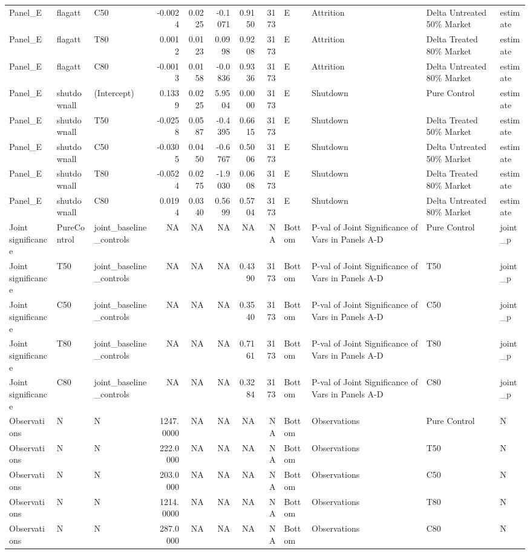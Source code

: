 \begin{table}
\begin{tabular}[t]{lllrrrrrllll}
Panel\_E & flagatt & C50 & -0.0024 & 0.0225 & -0.1071 & 0.9150 & 3173 & E & Attrition & Delta Untreated 50\% Market & estimate\\
Panel\_E & flagatt & T80 & 0.0012 & 0.0123 & 0.0998 & 0.9208 & 3173 & E & Attrition & Delta Treated 80\% Market & estimate\\
Panel\_E & flagatt & C80 & -0.0013 & 0.0158 & -0.0836 & 0.9336 & 3173 & E & Attrition & Delta Untreated 80\% Market & estimate\\
\addlinespace
Panel\_E & shutdownall & (Intercept) & 0.1339 & 0.0225 & 5.9504 & 0.0000 & 3173 & E & Shutdown & Pure Control & estimate\\
Panel\_E & shutdownall & T50 & -0.0258 & 0.0587 & -0.4395 & 0.6615 & 3173 & E & Shutdown & Delta Treated 50\% Market & estimate\\
Panel\_E & shutdownall & C50 & -0.0305 & 0.0450 & -0.6767 & 0.5006 & 3173 & E & Shutdown & Delta Untreated 50\% Market & estimate\\
Panel\_E & shutdownall & T80 & -0.0524 & 0.0275 & -1.9030 & 0.0608 & 3173 & E & Shutdown & Delta Treated 80\% Market & estimate\\
Panel\_E & shutdownall & C80 & 0.0194 & 0.0340 & 0.5699 & 0.5704 & 3173 & E & Shutdown & Delta Untreated 80\% Market & estimate\\
\addlinespace
Joint significance & PureControl & joint\_baseline\_controls & NA & NA & NA & NA & NA & Bottom & P-val of Joint Significance of Vars in Panels A-D & Pure Control & joint\_p\\
Joint significance & T50 & joint\_baseline\_controls & NA & NA & NA & 0.4390 & 3173 & Bottom & P-val of Joint Significance of Vars in Panels A-D & T50 & joint\_p\\
Joint significance & C50 & joint\_baseline\_controls & NA & NA & NA & 0.3540 & 3173 & Bottom & P-val of Joint Significance of Vars in Panels A-D & C50 & joint\_p\\
Joint significance & T80 & joint\_baseline\_controls & NA & NA & NA & 0.7161 & 3173 & Bottom & P-val of Joint Significance of Vars in Panels A-D & T80 & joint\_p\\
Joint significance & C80 & joint\_baseline\_controls & NA & NA & NA & 0.3284 & 3173 & Bottom & P-val of Joint Significance of Vars in Panels A-D & C80 & joint\_p\\
\addlinespace
Observations & N & N & 1247.0000 & NA & NA & NA & NA & Bottom & Observations & Pure Control & N\\
Observations & N & N & 222.0000 & NA & NA & NA & NA & Bottom & Observations & T50 & N\\
Observations & N & N & 203.0000 & NA & NA & NA & NA & Bottom & Observations & C50 & N\\
Observations & N & N & 1214.0000 & NA & NA & NA & NA & Bottom & Observations & T80 & N\\
Observations & N & N & 287.0000 & NA & NA & NA & NA & Bottom & Observations & C80 & N\\
\bottomrule
\end{tabular}
\end{table}
